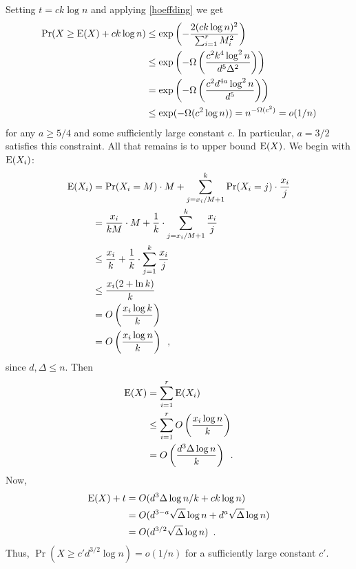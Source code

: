 \documentclass{patmorin}
\begin{document}
Setting $t=ck\log n$ and applying \cref{hoeffding} we get
\begin{align*}
  \Pr(X\ge \mathrm{E}(X) + ck\log n)
  & \le \exp\left(-\frac{2(ck\log n)^2}{\sum_{i=1}^r M_i^2}\right) \\
  & \le \exp\left(-\Omega\left(\frac{c^2k^4\log^2 n}{d^5\Delta^2}\right)\right) \\
  & = \exp\left(-\Omega\left(\frac{c^2d^{4a}\log^{2} n}{d^5}\right)\right) \\
  & \le \exp(-\Omega(c^2\log n)) = n^{-\Omega(c^2)} = o(1/n)
\end{align*}
for any $a\ge 5/4$ and some sufficiently large constant $c$.  In particular, $a=3/2$ satisfies this constraint.  All that remains is to upper bound $\mathrm{E}(X)$.  We begin with $\mathrm{E}(X_i)$:
\begin{align*}
  \mathrm{E}(X_i)
  & =\Pr(X_i=M)\cdot M + \sum_{j=x_i/M+1}^k \Pr(X_i=j)\cdot\frac{x_i}{j} \\
  & =\frac{x_i}{kM}\cdot M + \frac{1}{k}\cdot\sum_{j=x_i/M+1}^k \frac{x_i}{j} \\
  & \le \frac{x_i}{k} + \frac{1}{k}\cdot\sum_{j=1}^k \frac{x_i}{j} \\
  & \le \frac{x_i(2+\ln k)}{k} \\
  & = O\left(\frac{x_i\log k}{k}\right) \\
  & = O\left(\frac{x_i\log n}{k}\right)
  \enspace ,
\end{align*}
since $d,\Delta\le n$.  Then
\begin{align*}
  \mathrm{E}(X) & = \sum_{i=1}^r\mathrm{E}(X_i) \\
  & \le \sum_{i=1}^r O\left(\frac{x_i\log n}{k}\right) \\
  & = O\left(\frac{d^3\Delta\log n}{k}\right)
   \enspace .
\end{align*}
Now,
\begin{align*}
  \mathrm{E}(X)+t & = O(d^3\Delta\log n/k + ck\log n) \\
  & = O(d^{3-a}\sqrt{\Delta}\log n + d^a\sqrt{\Delta}\log n) \\
  & = O(d^{3/2}\sqrt{\Delta}\log n) \enspace .
\end{align*}
Thus, $\Pr(X\ge c'd^{3/2}\log n) =o(1/n)$ for a sufficiently large constant $c'$.
%
\end{document}

